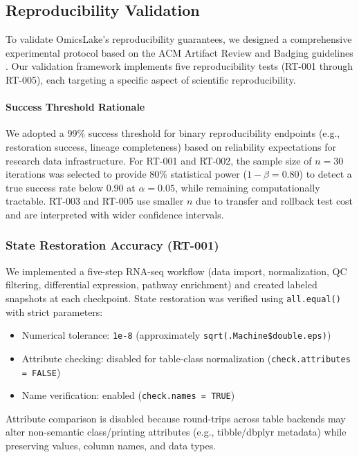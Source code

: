 \documentclass[11pt,a4paper]{article}
\begin{document}

\subsection{Reproducibility Validation}

To validate OmicsLake's reproducibility guarantees, we designed a comprehensive experimental protocol based on the ACM Artifact Review and Badging guidelines \citep{acm2020artifact}. Our validation framework implements five reproducibility tests (RT-001 through RT-005), each targeting a specific aspect of scientific reproducibility.

\paragraph{Success Threshold Rationale}
We adopted a 99\% success threshold for binary reproducibility endpoints (e.g., restoration success, lineage completeness) based on reliability expectations for research data infrastructure. For RT-001 and RT-002, the sample size of $n = 30$ iterations was selected to provide 80\% statistical power ($1 - \beta = 0.80$) to detect a true success rate below 0.90 at $\alpha = 0.05$, while remaining computationally tractable. RT-003 and RT-005 use smaller $n$ due to transfer and rollback test cost and are interpreted with wider confidence intervals.

\subsubsection{State Restoration Accuracy (RT-001)}

We implemented a five-step RNA-seq workflow (data import, normalization, QC filtering, differential expression, pathway enrichment) and created labeled snapshots at each checkpoint. State restoration was verified using \texttt{all.equal()} with strict parameters:

\begin{itemize}
    \item Numerical tolerance: \texttt{1e-8} (approximately \texttt{sqrt(.Machine\$double.eps)})
    \item Attribute checking: disabled for table-class normalization (\texttt{check.attributes = FALSE})
    \item Name verification: enabled (\texttt{check.names = TRUE})
\end{itemize}
Attribute comparison is disabled because round-trips across table backends may alter non-semantic class/printing attributes (e.g., tibble/dbplyr metadata) while preserving values, column names, and data types.
\end{document}

